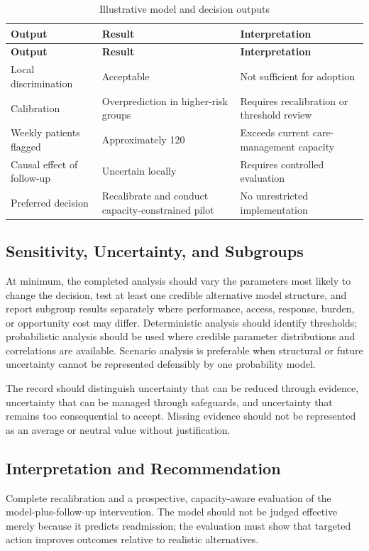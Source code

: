 \begin{longtable}{@{}p{}p{}p{}@{}}
\caption{Illustrative model and decision outputs}
\label{tab:comp-ch11-outputs}\\
\toprule
\textbf{Output} & \textbf{Result} & \textbf{Interpretation} \\
\midrule
\endfirsthead
\toprule
\textbf{Output} & \textbf{Result} & \textbf{Interpretation} \\
\midrule
\endhead
\bottomrule
\endlastfoot
Local discrimination & Acceptable & Not sufficient for adoption \\
Calibration & Overprediction in higher-risk groups & Requires recalibration or threshold review \\
Weekly patients flagged & Approximately 120 & Exceeds current care-management capacity \\
Causal effect of follow-up & Uncertain locally & Requires controlled evaluation \\
Preferred decision & Recalibrate and conduct capacity-constrained pilot & No unrestricted implementation \\
\end{longtable}

\subsection{Sensitivity, Uncertainty, and Subgroups}
At minimum, the completed analysis should vary the parameters most likely to
change the decision, test at least one credible alternative model structure, and
report subgroup results separately where performance, access, response, burden,
or opportunity cost may differ. Deterministic analysis should identify thresholds;
probabilistic analysis should be used where credible parameter distributions and
correlations are available. Scenario analysis is preferable when structural or
future uncertainty cannot be represented defensibly by one probability model.

The record should distinguish uncertainty that can be reduced through evidence,
uncertainty that can be managed through safeguards, and uncertainty that remains
too consequential to accept. Missing evidence should not be represented as an
average or neutral value without justification.

\subsection{Interpretation and Recommendation}
Complete recalibration and a prospective, capacity-aware evaluation of the model-plus-follow-up intervention. The model should not be judged effective merely because it predicts readmission; the evaluation must show that targeted action improves outcomes relative to realistic alternatives.

